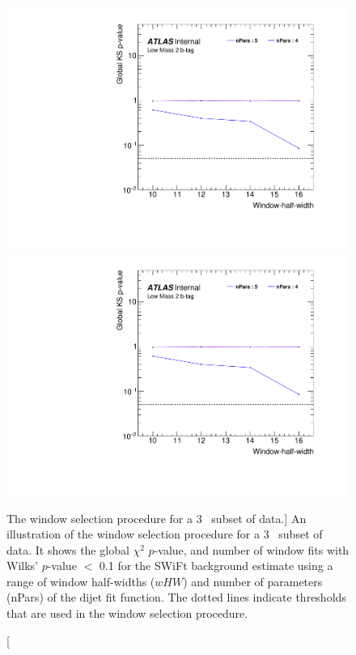 \begin{figure}[!htb]
\captionsetup[subfigure]{aboveskip=0pt,justification=centering}
\centering
{} {
  \includegraphics[width=0.45\linewidth, angle=0,page=2]{figs/Dibjet/LowMass/FitStudy_min566/windowSel_subset.pdf}
}\hspace{-8mm}
 {
  \includegraphics[width=0.45\linewidth, angle=0,page=4]{figs/Dibjet/LowMass/FitStudy_min566/windowSel_subset.pdf}
}

\vspace{-0.5em}
\caption
    [The window selection procedure for a 3~\ifb{} subset of \lm{} data.]
    {\label{fig:windowSel_subset}
      An illustration of the window selection procedure for a 3~\ifb{} subset of \lm{} data.
      It shows the global $\chi^{2}$ \mbox{$p$-value}, %
      and number of window fits with Wilks' \mbox{$p$-value} $<$ 0.1 for the SWiFt background estimate
      using a range of window half-widths ($wHW$) and number of parameters (nPars) of the dijet fit function.
      The dotted lines indicate thresholds that are used in the window selection procedure.
    }
\vspace{-1em}
\end{figure}


